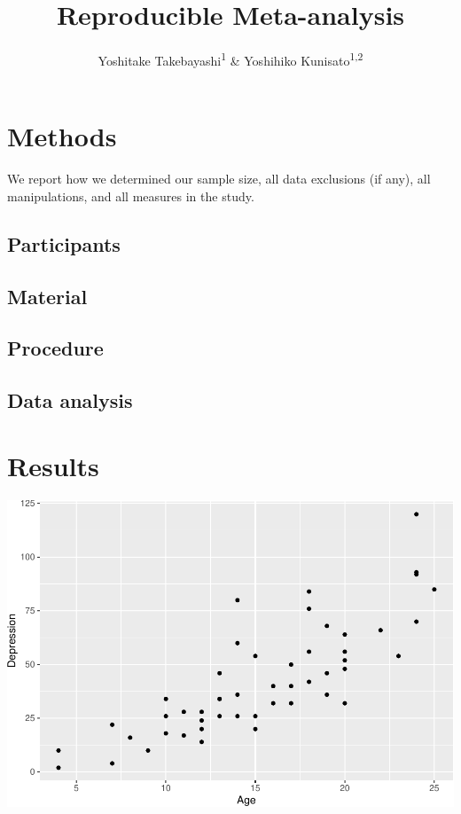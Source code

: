 \documentclass[
  english,
  man,draftall]{apa6}
\title{Reproducible Meta-analysis}
\author{Yoshitake Takebayashi\textsuperscript{1} \& Yoshihiko Kunisato\textsuperscript{1,2}}
\date{}
\affiliation{\vspace{0.5cm}\textsuperscript{1} Fukushima Medical University\\\textsuperscript{2} Senshu University}
\begin{document}
\maketitle

\hypertarget{methods}{%
\section{Methods}\label{methods}}

We report how we determined our sample size, all data exclusions (if any), all manipulations, and all measures in the study.

\hypertarget{participants}{%
\subsection{Participants}\label{participants}}

\hypertarget{material}{%
\subsection{Material}\label{material}}

\hypertarget{procedure}{%
\subsection{Procedure}\label{procedure}}

\hypertarget{data-analysis}{%
\subsection{Data analysis}\label{data-analysis}}

\hypertarget{results}{%
\section{Results}\label{results}}

\includegraphics{paper_files/figure-latex/unnamed-chunk-1-1.pdf}
\end{document}
